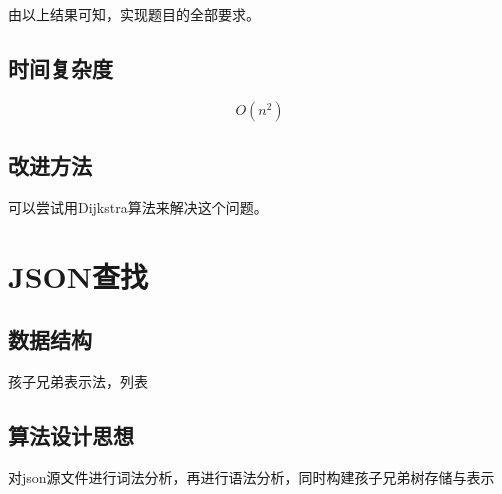 \documentclass[a4paper,11pt,UTF8]{ctexart}
\begin{document}
    由以上结果可知，实现题目的全部要求。

\subsection{时间复杂度}
$$
O(n^2)
$$
\subsection{改进方法}
可以尝试用Dijkstra算法来解决这个问题。
\section{JSON查找}

\subsection{数据结构}

孩子兄弟表示法，列表
\subsection{算法设计思想}

对json源文件进行词法分析，再进行语法分析，同时构建孩子兄弟树存储与表示
\end{document}
